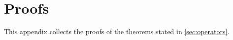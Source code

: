
\newpage
\section{Proofs}
\label{app:proofs}

This appendix collects the proofs of the theorems stated in \cref{sec:operators}.







